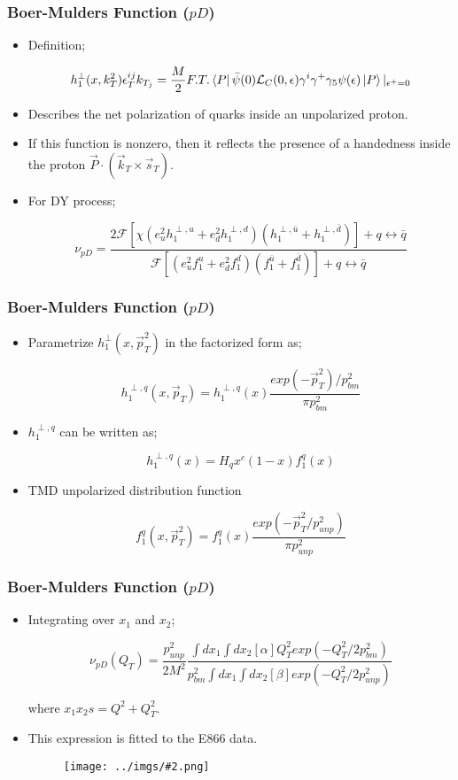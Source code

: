 \documentclass[10pt, xcolor={dvipsnames}, aspectratio = 169, sans,mathserif]{beamer}
\newcommand{\MyPic}[2]
{
\begin{figure}[fragile]
    \centering
    \texttt{[image: ../imgs/\#2.png]}
\end{figure}
}
\newcommand{\MySlide}[1]
{
\begin{frame}
#1
\end{frame}
}
\newcommand{\MyMath}[1]
{
\begin{equation*}
#1
\end{equation*}
}
\newcommand{\MyList}[1]
{
\begin{itemize}
#1
\end{itemize}
}
\begin{document}
\MySlide{
\frametitle{Boer-Mulders Function ($pD$)}

\MyList{

\item Definition;

\MyMath{
h_{1}^{\perp}(x, k_{T}^{2})\epsilon^{ij}_{T}k_{T_{j}} = \frac{M}{2}F.T.\bra{P}\bar{\psi}(0)\mathcal{L}_{C}(0, \epsilon) \gamma^{i}\gamma^{+}\gamma_{5}\psi(\epsilon)\ket{P}|_{\epsilon^{+} = 0}
}

\item Describes the net polarization of quarks inside an unpolarized proton.

\item If this function is nonzero, then it reflects the presence of a handedness inside the proton $\vec{P} \cdot (\vec{k}_{T} \times \vec{s}_{T})$.

\item For DY process;

\MyMath{
\nu_{pD} = \frac{2\mathcal{F}[\chi(e^{2}_{u}h^{\perp, u}_{1} + e^{2}_{d}h_{1}^{\perp, d})(h_{1}^{\perp, \bar{u}} + h_{1}^{\perp, \bar{d}})] + q \leftrightarrow \bar{q}}{\mathcal{F}[(e^{2}_{u}f^{u}_{1} + e^{2}_{d}f^{d}_{1})(f_{1}^{\bar{u}} + f_{1}^{\bar{d}})]+ q \leftrightarrow \bar{q}}
}
}
}

\MySlide{
\frametitle{Boer-Mulders Function ($pD$)}

\MyList{

\item Parametrize $h_{1}^{\perp}(x, \vec{p}_{T}^{2})$ in the factorized form as;

\MyMath{
h_{1}^{\perp, q} (x, \vec{p}_{T}) = h_{1}^{\perp, q}(x)\frac{exp(-\vec{p}_{T}^{2})/p_{bm}^{2}}{\pi p^{2}_{bm}}
}

\item $h_{1}^{\perp, q}$ can be written as;

\MyMath{h_{1}^{\perp, q} (x) = H_{q} x^{c} (1-x) f_{1}^{q} (x)}

\item TMD unpolarized distribution function

\MyMath{f_{1}^{q}(x, \vec{p}_{T}^{2}) = f_{1}^{q}(x)\frac{exp(-\vec{p}_{T}^{2}/p^{2}_{unp})}{\pi p^{2}_{unp}}}
}
}


\MySlide{
\frametitle{Boer-Mulders Function ($pD$)}

\MyList{
\item Integrating over $x_{1}$ and $x_{2}$;

\MyMath{
\nu_{pD}(Q_{T}) = \frac{p^{2}_{unp}}{2M^{2}}\frac{\int dx_{1}\int dx_{2} [\alpha]Q_{T}^{2}exp(-Q_{T}^{2}/2p_{bm}^{2})}{p^{2}_{bm} \int dx_{1} \int dx_{2}[\beta] exp(-Q_{T}^{2}/2p_{unp}^{2})}
}

where $x_{1}x_{2}s = Q^{2} + Q_{T}^{2}$.

\item This expression is fitted to the E866 data.

\MyPic{7.0}{fit_coef}
}
}
\end{document}
